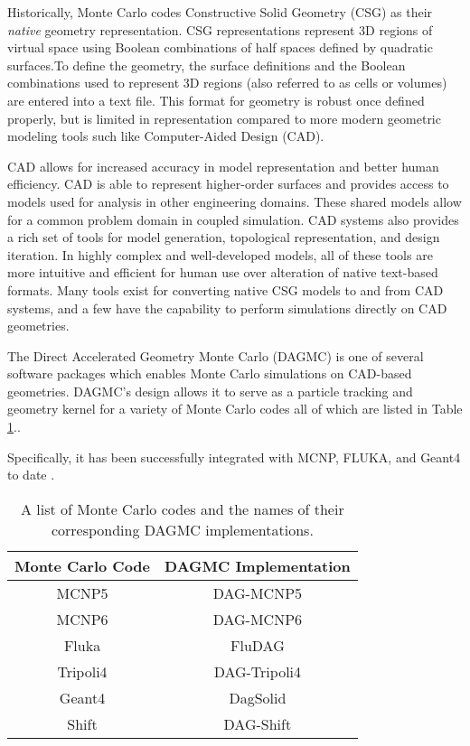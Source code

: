 Historically, Monte Carlo codes Constructive Solid Geometry (CSG) as their
\textit{native} geometry representation. CSG representations represent 3D
regions of virtual space using Boolean combinations of half spaces defined by
quadratic surfaces.To define the geometry, the surface definitions and the
Boolean combinations used to represent 3D regions (also referred to as cells or
volumes) are entered into a text file. This format for geometry is robust once
defined properly, but is limited in representation compared to more modern
geometric modeling tools such like Computer-Aided Design (CAD).

CAD allows for increased accuracy in model representation and better human
efficiency. CAD is able to represent higher-order surfaces and provides access
to models used for analysis in other engineering domains. These shared models
allow for a common problem domain in coupled simulation. CAD systems also provides a
rich set of tools for model generation, topological representation, and design
iteration. In highly complex and well-developed models, all of these tools are
more intuitive and efficient for human use over alteration of native text-based
formats. Many tools exist for converting native CSG models to and from CAD
systems, and a few have the capability to perform simulations directly on CAD
geometries.

The Direct Accelerated Geometry Monte Carlo (DAGMC) \cite{Tautges_2009} is one
of several software packages which enables Monte Carlo simulations on CAD-based
geometries. DAGMC's design allows it to serve as a particle
tracking and geometry kernel for a variety of Monte Carlo codes all of which are
listed in Table \ref{tab:dagmc_implementations}..


Specifically,
it has been successfully integrated with MCNP, FLUKA, and Geant4 to
date \cite{LANL_MCNP5_VOLIII, Bohlen_2014, GEANT4_2003}.

\begin{table}[H]
  \centering
  \begin{tabular}{c c}
    \hline
    Monte Carlo Code & DAGMC Implementation \\
    \hline
    MCNP5            & DAG-MCNP5            \\
    MCNP6            & DAG-MCNP6            \\
    Fluka            & FluDAG               \\
    Tripoli4         & DAG-Tripoli4         \\
    Geant4           & DagSolid             \\
    Shift            & DAG-Shift            \\
    \hline
  \end{tabular}
  \caption{A list of Monte Carlo codes and the names of their corresponding DAGMC implementations.}
  \label{tab:dagmc_implementations}
\end{table}

